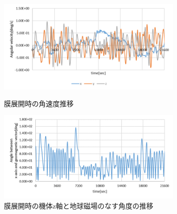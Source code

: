 \begin{figure}[htbp]
	\centering
	\includegraphics[width=9cm]{./03/fig/3_5_sim_membrane_angvel.png}
	\caption{膜展開時の角速度推移}
	\label{3_5_sim_membrane_angvel}
	\centering
	\includegraphics[width=9cm]{./03/fig/3_5_sim_membrane_zang.png}
	\caption{膜展開時の機体z軸と地球磁場のなす角度の推移}
	\label{3_5_sim_membrane_zang}
\end{figure}
